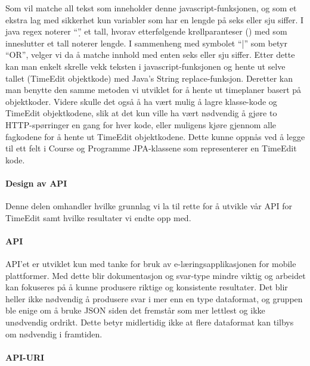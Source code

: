 \documentclass[../main.tex]{subfiles}
\begin{document}
Som vil matche all tekst som inneholder denne javascript-funksjonen, og som et ekstra lag med sikkerhet kun variabler som har en lengde på seks eller sju siffer. I java regex noterer “\d” et tall, hvorav etterfølgende krøllparanteser ({}) med som inneslutter et tall noterer lengde. I sammenheng med symbolet “|” som betyr “OR”, velger vi da å matche innhold med enten seks eller sju siffer.
Etter dette kan man enkelt skrelle vekk teksten i javascript-funksjonen og hente ut selve tallet (TimeEdit objektkode) med Java’s String replace-funksjon.
Deretter kan man benytte den samme metoden vi utviklet for å hente ut timeplaner basert på objektkoder. Videre skulle det også å ha vært mulig å lagre klasse-kode og TimeEdit objektkodene, slik at det kun ville ha vært nødvendig å gjøre to HTTP-spørringer en gang for hver kode, eller muligens kjøre gjennom alle fagkodene for å hente ut TimeEdit objektkodene. Dette kunne oppnås ved å legge til ett felt i Course og Programme JPA-klassene som representerer en TimeEdit kode. 

\paragraph{Design av API}
Denne delen omhandler hvilke grunnlag vi la til rette for å utvikle vår API for TimeEdit samt hvilke resultater vi endte opp med.

\paragraph{API}
API’et er utviklet kun med tanke for bruk av e-læringsapplikasjonen for mobile plattformer. Med dette blir dokumentasjon og svar-type mindre viktig og arbeidet kan fokuseres på å kunne produsere riktige og konsistente resultater. Det blir heller ikke nødvendig å produsere svar i mer enn en type dataformat, og gruppen ble enige om å bruke JSON siden det fremstår som mer lettlest og ikke unødvendig ordrikt. Dette betyr midlertidig ikke at flere dataformat kan tilbys om nødvendig i framtiden.

\paragraph{API-URI}
\end{document}
